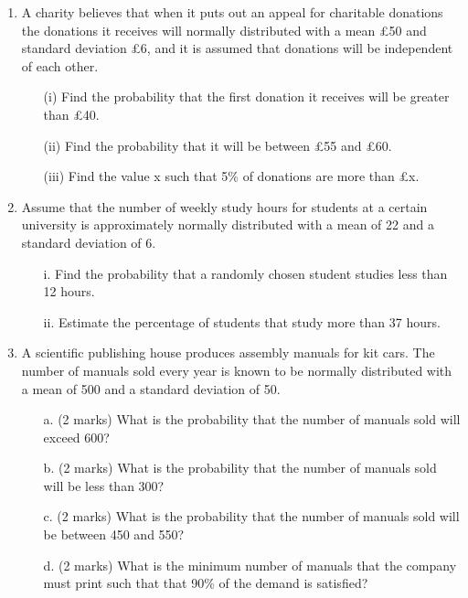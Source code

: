 \documentclass[]{article}
\begin{document}
\begin{enumerate}
\item 
A charity believes that when it puts out an appeal for charitable donations the
donations it receives will normally distributed with a mean £50 and standard
deviation £6, and it is assumed that donations will be independent of each
other.
\begin{itemize}
	\item[(i)] Find the probability that the first donation it receives will be greater
	than £40.
	\item[(ii)] Find the probability that it will be between £55 and £60.
	\item[(iii)] Find the value x such that 5\% of donations are more than £x.
\end{itemize}




\item 
Assume that the number of weekly study hours for students at a certain university is approximately normally distributed with a mean of 22 and a standard deviation of 6.

\begin{itemize}
	\item[i.] Find the probability that a randomly chosen student studies less than 12 hours.
	\item[ii.] Estimate the percentage of students that study more than 37 hours.
\end{itemize}

\item
	
	A scientific publishing house produces assembly manuals for kit cars. The number
	of manuals sold every year is known to be normally distributed with a mean of 500 and a
	standard deviation of 50.
	
	\begin{itemize}
		\item[a.](2 marks) What is the probability that the number of manuals sold will exceed 600?
		\item[b.](2 marks) What is the probability that the number of manuals sold will be less than 300?
		\item[c.](2 marks)  What is the probability that the number of manuals sold will be between 450 and 550?
		\item[d.](2 marks)  What is the minimum number of manuals that the company must print such
		that that 90\% of the demand is satisfied?
	\end{itemize}
	


\end{enumerate}
\end{document}
